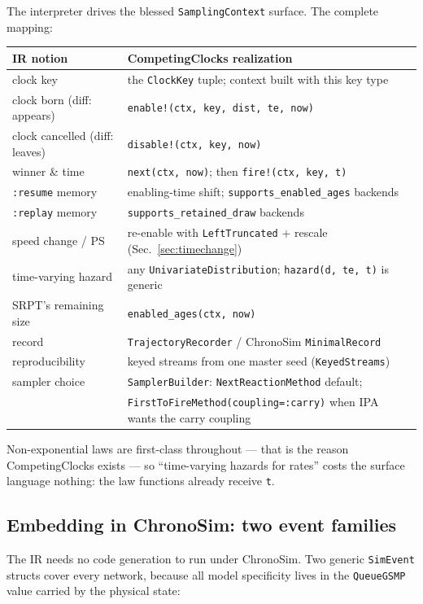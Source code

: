 \documentclass[11pt]{article}
\newcommand{\code}[1]{\texttt{#1}}
\begin{document}
The interpreter drives the blessed \code{SamplingContext} surface. The
complete mapping:

\begin{center}
\small
\begin{tabular}{@{}ll@{}}
\toprule
IR notion & CompetingClocks realization \\
\midrule
clock key & the \code{ClockKey} tuple; context built with this key type \\
clock born (diff: appears)     & \code{enable!(ctx, key, dist, te, now)} \\
clock cancelled (diff: leaves) & \code{disable!(ctx, key, now)} \\
winner \& time  & \code{next(ctx, now)}; then \code{fire!(ctx, key, t)} \\
\code{:resume} memory & enabling-time shift; \code{supports\_enabled\_ages} backends \\
\code{:replay} memory & \code{supports\_retained\_draw} backends \\
speed change / PS & re-enable with \code{LeftTruncated} + rescale (Sec.~\ref{sec:timechange}) \\
time-varying hazard & any \code{UnivariateDistribution}; \code{hazard(d, te, t)} is generic \\
SRPT's remaining size & \code{enabled\_ages(ctx, now)} \\
record & \code{TrajectoryRecorder} / ChronoSim \code{MinimalRecord} \\
reproducibility & keyed streams from one master seed (\code{KeyedStreams}) \\
sampler choice & \code{SamplerBuilder}: \code{NextReactionMethod} default; \\
& \code{FirstToFireMethod(coupling=:carry)} when IPA wants the carry coupling \\
\bottomrule
\end{tabular}
\end{center}

Non-exponential laws are first-class throughout --- that is the reason
CompetingClocks exists --- so ``time-varying hazards for rates'' costs the
surface language nothing: the law functions already receive \code{t}.

\subsection{Embedding in ChronoSim: two event families}

The IR needs no code generation to run under ChronoSim. Two generic
\code{SimEvent} structs cover every network, because all model specificity
lives in the \code{QueueGSMP} value carried by the physical state:
\end{document}
